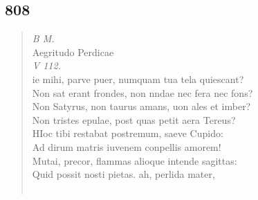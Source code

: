 \documentclass[11pt, a4paper]{report}
\begin{document}
            \subsection*{808}
      \begin{verse}
      \textit{B M.} \\ Aegritudo Perdicae \\ \textit{V 112.} \\ ie mihi, parve puer, numquam tua tela quiescant? \\ Non sat erant frondes, non nndae nec fera nec fons? \\ Non Satyrus, non taurus amans, uon ales et imber? \\ Non tristes epulae, post quas petit aera Tereus? \\ HIoc tibi restabat postremum, saeve Cupido: \\ Ad dirum matris iuvenem conpellis amorem! \\ Mutai, precor, flammas alioque intende sagittas: \\ Quid possit nosti pietas. ah, perlida mater, \\ 
        ﻿\pagebreak 

\end{verse}
\end{document}
